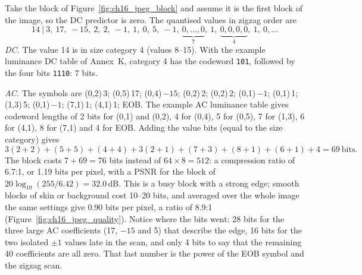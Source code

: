 
\begin{worked}
Take the block of Figure~\ref{fig:ch16_jpeg_block} and assume it is the first block of the image, so the
DC predictor is zero. The quantised values in zigzag order are
\[
14\ \big|\ 3,\ 17,\ -15,\ 2,\ 2,\ -1,\ 1,\ 0,\ 5,\ -1,\ \underbrace{0,\dots,0}_{7},\ 1,\ \underbrace{0,0,0,0}_{4},\ 1,\ 0,\dots
\]
\emph{DC.} The value 14 is in size category 4 (values 8--15). With the example luminance DC table of
Annex~K, category 4 has the codeword \texttt{101}, followed by the four bits \texttt{1110}: 7 bits.

\emph{AC.} The symbols are (0,2)\,3; (0,5)\,17; (0,4)\,$-15$; (0,2)\,2; (0,2)\,2; (0,1)\,$-1$; (0,1)\,1;
(1,3)\,5; (0,1)\,$-1$; (7,1)\,1; (4,1)\,1; EOB. The example AC luminance table gives codeword lengths of 2
bits for (0,1) and (0,2), 4 for (0,4), 5 for (0,5), 7 for (1,3), 6 for (4,1), 8 for (7,1) and 4 for EOB.
Adding the value bits (equal to the size category) gives
\[
3(2+2)+(5+5)+(4+4)+3(2+1)+(7+3)+(8+1)+(6+1)+4=69\ \text{bits}.
\]
The block costs $7+69=76$ bits instead of $64\times8=512$: a compression ratio of 6.7:1, or 1.19 bits
per pixel, with a PSNR for the block of $20\log_{10}(255/6.42)=32.0$\,dB. This is a busy block with a
strong edge; smooth blocks of skin or background cost 10--20 bits, and averaged over the whole image
the same settings give 0.90 bits per pixel, a ratio of 8.9:1 (Figure~\ref{fig:ch16_jpeg_quality}).
Notice where the bits went: 28 bits for the three large AC coefficients (17, $-15$ and 5) that describe
the edge, 16 bits for the two isolated $\pm1$ values late in the scan, and only 4 bits to say that the
remaining 40 coefficients are all zero. That last number is the power of the EOB symbol and the zigzag scan.
\end{worked}



